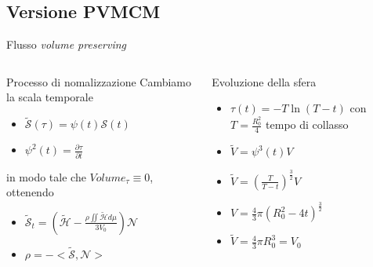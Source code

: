 \subsection*{Versione PVMCM}
\begin{frame}{Flusso \emph{volume preserving}}
  \begin{columns}[T]
    \begin{column}{6cm}
      \begin{block}{Processo di nomalizzazione}
        Cambiamo la scala temporale
        \begin{itemize}
        \item $\mathcal{\tilde{S}(\tau)}=\psi(t)\mathcal{S}(t)$ 
        \item $\psi^2(t)=\frac{\partial\tau}{\partial t}$
        \end{itemize}
         in modo tale che \alert{$Volume_{\tau}\equiv 0$}, ottenendo   
         \begin{itemize}
         \item $\mathcal{\tilde{S}}_t=\left(\mathcal{\tilde{H}}-\frac{\rho\iint\mathcal{\tilde{H}}d\mu}{3V_0}\right)\mathcal{N}$
         \item $\rho =-<\mathcal{\tilde{S}},\mathcal{N}>$
         \end{itemize}
      \end{block}
    \end{column}
    \begin{column}[T]{4cm}
      \begin{exampleblock}{Evoluzione della sfera}
        \begin{itemize}
        \item $\tau(t)=-T\ln(T-t)$ con $T=\frac{R_0^2}{4}$ tempo di
          collasso
        \item $\tilde{V}=\psi^3(t)V$
        \item $\tilde{V}=\left(\frac{T}{T-t}\right)^{\frac{3}{2}}V$
        \item $V=\frac{4}{3}\pi(R_0^2-4t)^{\frac{3}{2}}$
        \item $\tilde{V}=\frac{4}{3}\pi R_0^3=V_0$
        \end{itemize}
      \end{exampleblock}
    \end{column}
  \end{columns}
\end{frame}
